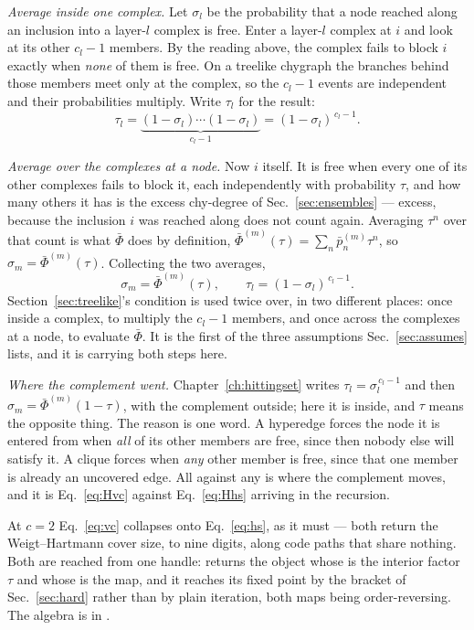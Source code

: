 \emph{Average inside one complex.} Let $\sigma_{l}$ be the probability that a
node reached along an inclusion into a layer-$l$ complex is free. Enter a
layer-$l$ complex at $i$ and look at its other $c_{l}-1$ members. By the reading
above, the complex fails to block $i$ exactly when \emph{none} of them is free.
On a treelike chygraph the branches behind those members meet only at the
complex, so the $c_{l}-1$ events are independent and their probabilities
multiply. Write $\tau_{l}$ for the result:
\[
  \tau_{l}=\underbrace{(1-\sigma_{l})\cdots(1-\sigma_{l})}_{c_{l}-1}
          =(1-\sigma_{l})^{\,c_{l}-1}.
\]

\emph{Average over the complexes at a node.} Now $i$ itself. It is free when
every one of its other complexes fails to block it, each independently with
probability $\tau$, and how many others it has is the excess chy-degree of
Sec.~\ref{sec:ensembles} --- excess, because the inclusion $i$ was reached
along does not count again. Averaging $\tau^{n}$ over that count is what
$\bar\Phi$ does by definition, $\bar\Phi^{(m)}(\tau)=\sum_{n}\bar p^{(m)}_{n}
\tau^{n}$, so $\sigma_{m}=\bar\Phi^{(m)}(\tau)$. Collecting the two averages,
\begin{equation}
  \sigma_{m}=\bar\Phi^{(m)}(\tau),
  \qquad
  \tau_{l}=(1-\sigma_{l})^{\,c_{l}-1}.
  \label{eq:vc}
\end{equation}
Section~\ref{sec:treelike}'s condition is used twice
over, in two different places: once inside a complex, to multiply the
$c_{l}-1$ members, and once across the complexes at a node, to evaluate
$\bar\Phi$. It is the first of the three assumptions Sec.~\ref{sec:assumes}
lists, and it is carrying both steps here.

\emph{Where the complement went.} Chapter~\ref{ch:hittingset} writes
$\tau_{l}=\sigma_{l}^{\,c_{l}-1}$ and then $\sigma_{m}=\bar\Phi^{(m)}(1-\tau)$,
with the complement outside; here it is inside, and $\tau$ means the opposite
thing. The reason is one word. A hyperedge forces the node it is entered from
when \emph{all} of its other members are free, since then nobody else will
satisfy it. A clique forces when \emph{any} other member is free, since that one
member is already an uncovered edge. All against any is where the complement
moves, and it is Eq.~\eqref{eq:Hvc} against Eq.~\eqref{eq:Hhs} arriving in the
recursion.

At $c=2$ Eq.~\eqref{eq:vc} collapses onto Eq.~\eqref{eq:hs}, as it must --- both
return the Weigt--Hartmann cover size, to nine digits, along code paths that
share nothing. Both are reached from one handle: 
returns the object whose  is the interior factor $\tau$ and whose
 is the map, and it reaches its fixed point by the bracket of
Sec.~\ref{sec:hard} rather than by plain iteration, both maps being
order-reversing. The algebra is in .

